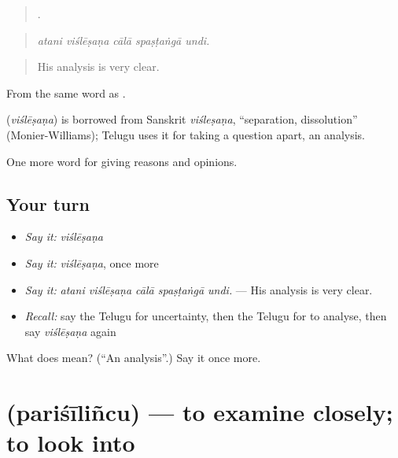 \begin{quote}
    .
\end{quote}

\begin{quote}
\emph{atani viślēṣaṇa cālā spaṣṭaṅgā undi.}
\end{quote}

\begin{quote}
His analysis is very clear.
\end{quote}

From the same word as .

\begin{cousinweb}
\textbf{} (\emph{viślēṣaṇa}) is borrowed from Sanskrit \emph{viśleṣaṇa}, \textquotedblleft{}separation, dissolution\textquotedblright{} (Monier-Williams); Telugu uses it for taking a question apart, an analysis.
\end{cousinweb}

\begin{grammarlens}[title={What you've built}]
One more word for giving reasons and opinions.
\end{grammarlens}

\subsection*{Your turn}
\begin{itemize}
\raggedright
  \item \emph{Say it:} \emph{viślēṣaṇa}
  \item \emph{Say it:} \emph{viślēṣaṇa}, once more
  \item \emph{Say it:} \emph{atani viślēṣaṇa cālā spaṣṭaṅgā undi.} — His analysis is very clear.
  \item \emph{Recall:} say the Telugu for uncertainty, then the Telugu for to analyse, then say \emph{viślēṣaṇa} again
\end{itemize}

\begin{tcolorbox}[breakable,colback=teal!4,colframe=teal!35!black,title={Before you move on}]
What does  mean? (\textquotedblleft{}An analysis\textquotedblright{}.) Say it once more.
\end{tcolorbox}
\section[\texorpdfstring{\te{పరిశీలించు} (pariśīliñcu)}{పరిశీలించు (pariśīliñcu)}]{ (pariśīliñcu) — to examine closely; to look into}


